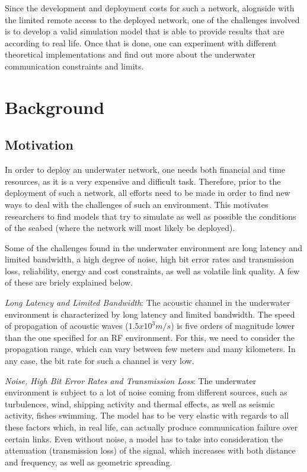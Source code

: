 \documentclass[a4paper]{IEEEtran}
\begin{document}
Since the development and deployment costs for such a network, alognside with
the limited remote access to the deployed network,  one of the challenges
involved is to develop a valid simulation model that is able to provide results
that are according to real life. Once that is done, one can experiment with
different theoretical implementations and find out more about the underwater
communication constraints and limits.

\section{Background}
\subsection{Motivation}
In order to deploy an underwater network, one needs both financial and time
resources, as it is a very expensive and difficult task. Therefore, prior to the
deployment of such a network, all efforts need to be made in order to find new
ways to deal with the challenges of such an environment. This motivates
researchers to find models that try to simulate as well as possible the
conditions of the seabed (where the network will most likely be deployed).

Some of the challenges found in the underwater environment are long latency and
limited bandwidth, a high degree of noise, high bit error rates and transmission
loss, reliability, energy and cost constraints, as well as volatile link
quality. A few of these are briely explained below.

\textit{Long Latency and Limited Bandwidth}: The acoustic channel in the
underwater environment is characterized by long latency and limited bandwidth.
The speed of propagation of acoustic waves ($1.5 x 10^3 m/s$) is five orders of
magnitude lower than the one specified for an RF environment. For this, we need
to consider the propagation range, which can vary between few meters and many
kilometers. In any case, the bit rate for such a channel is very low.

\textit{Noise, High Bit Error Rates and Transmission Loss}: The underwater
environment is subject to a lot of noise coming from different sources, such as
turbulences, wind, shipping activity and thermal effects, as well as seismic
activity, fishes swimming. The model has to be very elastic with regards to all
these factors which, in real life, can actually produce communication failure
over certain links. Even without noise, a model has to take into consideration
the attenuation (transmission loss) of the signal, which increases with both
distance and frequency, as well as geometric spreading.
\end{document}
